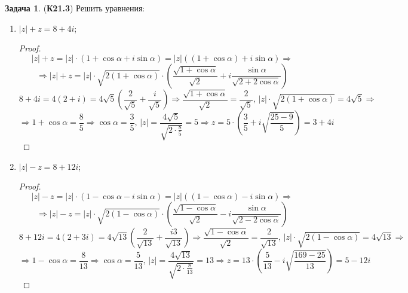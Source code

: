 \documentclass[12pt]{article}
\theoremstyle{definition}
\newtheorem{problem}{Задача}
\begin{document}
\begin{problem}(\textbf{К21.3}) Решить уравнения:
	\begin{enumerate}[label=\asbuk*)]
		\item $|z| + z = 8 + 4i$;
		\begin{proof}
			$$
				|z| + z = |z|{\cdot}(1 +\cos\alpha + i \sin\alpha) = |z|((1+\cos\alpha) + i \sin\alpha) \Rightarrow 
			$$
			$$
				\Rightarrow |z| + z = |z|{\cdot}\sqrt{2(1 + \cos\alpha)}{\cdot}\left(\dfrac{\sqrt{1 + \cos\alpha}}{\sqrt{2}} + i\dfrac{\sin{\alpha}}{\sqrt{2 + 2\cos\alpha}}\right)
			$$
			$$
				8 + 4i = 4(2 + i) = 4\sqrt{5}\left(\dfrac{2}{\sqrt{5}} + \dfrac{i}{\sqrt{5}}\right) \Rightarrow \dfrac{\sqrt{1 + \cos\alpha}}{\sqrt{2}}= \dfrac{2}{\sqrt{5}}, \, |z|{\cdot}\sqrt{2(1 + \cos\alpha)} = 4\sqrt{5} \Rightarrow
			$$
			$$
				\Rightarrow 1 + \cos\alpha = \dfrac{8}{5}\Rightarrow \cos\alpha = \dfrac{3}{5},\, |z| = \dfrac{4\sqrt{5}}{\sqrt{2{\cdot}\tfrac{8}{5}}} = 5 \Rightarrow z = 5{\cdot}\left(\dfrac{3}{5} + i\sqrt{\dfrac{25 - 9}{5}}\right) = 3 + 4i
			$$
		\end{proof}
		\item $|z| - z = 8 + 12i$;
		\begin{proof}
			$$
				|z| - z = |z|{\cdot}(1 -\cos\alpha - i \sin\alpha) = |z|((1-\cos\alpha) - i \sin\alpha) \Rightarrow 
			$$
			$$
				\Rightarrow |z| - z = |z|{\cdot}\sqrt{2(1 - \cos\alpha)}{\cdot}\left(\dfrac{\sqrt{1 - \cos\alpha}}{\sqrt{2}} - i\dfrac{\sin{\alpha}}{\sqrt{2 - 2\cos\alpha}}\right)
			$$
			$$
				8 + 12i = 4(2 + 3i) = 4\sqrt{13}\left(\dfrac{2}{\sqrt{13}} + \dfrac{i3}{\sqrt{13}}\right) \Rightarrow \dfrac{\sqrt{1 - \cos\alpha}}{\sqrt{2}}= \dfrac{2}{\sqrt{13}}, \, |z|{\cdot}\sqrt{2(1 - \cos\alpha)} = 4\sqrt{13} \Rightarrow
			$$
			$$
				\Rightarrow 1 - \cos\alpha = \dfrac{8}{13}\Rightarrow \cos\alpha = \dfrac{5}{13},\, |z| = \dfrac{4\sqrt{13}}{\sqrt{2{\cdot}\tfrac{8}{13}}} = 13 \Rightarrow z = 13{\cdot}\left(\dfrac{5}{13} - i\sqrt{\dfrac{169 - 25}{13}}\right) = 5 - 12i
			$$
		\end{proof}
	\end{enumerate}
\end{problem}
\end{document}
